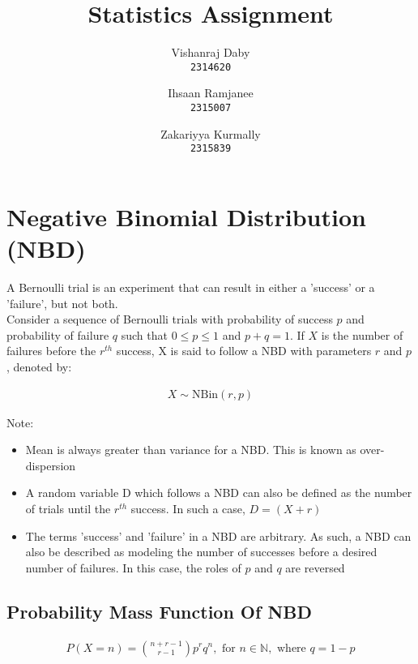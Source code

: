\documentclass{article}
\author{
  Vishanraj Daby \\
  \texttt{2314620}
  \and
  Ihsaan Ramjanee \\
  \texttt{2315007}
  \and
  Zakariyya Kurmally \\
  \texttt{2315839}
}
\title{Statistics Assignment}
\begin{document}
\maketitle

\pagebreak

\tableofcontents

\pagebreak

\section{Negative Binomial Distribution (NBD)}
A Bernoulli trial is an experiment that can result in either a
'success' or a 'failure', but not both. \\

Consider a sequence of Bernoulli trials with probability of success
$ p $ and probability of failure $ q $ such that $ 0 \leq p \leq 1 $
and $ p + q = 1 $. If $ X $ is the number of failures before the
$ r^{th} $ success, X is said to follow a NBD with parameters $ r $
and $ p $, denoted by:

\begin{gather*}
  X \sim \text{NBin}(r, p)
\end{gather*}

Note:
\begin{itemize}
  \item Mean is always greater than variance for a NBD. This is 
    known as over-dispersion
  \item A random variable D which follows a NBD can also be defined
    as the number of trials until the $ r^{th} $ success. In such a
    case, $ D = (X + r) $
  \item The terms 'success' and 'failure' in a NBD are arbitrary.
    As such, a NBD can also be described as modeling the number
    of successes before a desired number of failures. In this case,
    the roles of $p$ and $q$ are reversed
\end{itemize}


\subsection{Probability Mass Function Of NBD}

\begin{gather*}
  P(X = n) = {{n + r - 1} \choose {r - 1}} p^r q^n, 
  \text{ for } n \in \mathbb{N}, \text{ where } q = 1-p
\end{gather*}
\end{document}
